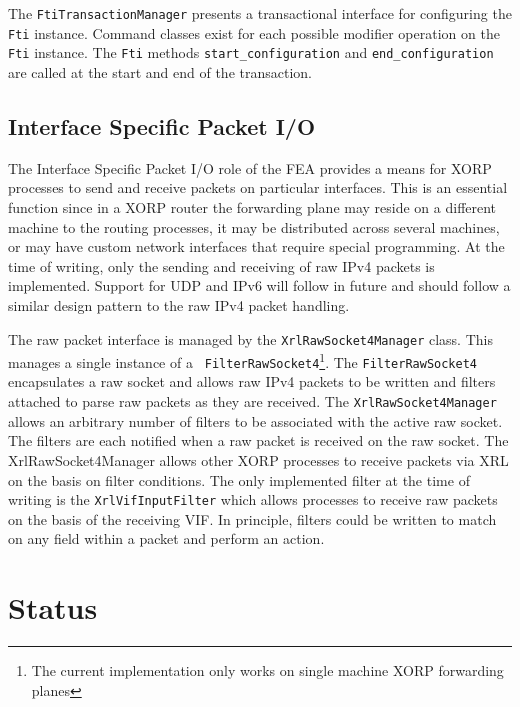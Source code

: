 \documentclass[11pt]{article}
\begin{document}
The {\tt FtiTransactionManager} presents a transactional interface for
configuring the {\tt Fti} instance.  Command classes exist for each
possible modifier operation on the {\tt Fti} instance.  The {\tt Fti}
methods {\tt start\_configuration} and {\tt end\_configuration} are
called at the start and end of the transaction.

\subsection{Interface Specific Packet I/O}

The Interface Specific Packet I/O role of the FEA provides a means for
XORP processes to send and receive packets on particular interfaces.
This is an essential function since in a XORP router the forwarding
plane may reside on a different machine to the routing processes, it
may be distributed across several machines, or may have custom network
interfaces that require special programming.  At the time of writing,
only the sending and receiving of raw IPv4 packets is implemented.
Support for UDP and IPv6 will follow in future and should follow a
similar design pattern to the raw IPv4 packet handling.

The raw packet interface is managed by the {\tt XrlRawSocket4Manager}
class.  This manages a single instance of a {\tt
FilterRawSocket4}\footnote{The current implementation only works on
single machine XORP forwarding planes}.  The {\tt FilterRawSocket4}
encapsulates a raw socket and allows raw IPv4 packets to be written
and filters attached to parse raw packets as they are received.  The
{\tt XrlRawSocket4Manager} allows an arbitrary number of filters to be
associated with the active raw socket.  The filters are each notified
when a raw packet is received on the raw socket.  The
XrlRawSocket4Manager allows other XORP processes to receive packets
via XRL on the basis on filter conditions.  The only implemented
filter at the time of writing is the {\tt XrlVifInputFilter} which
allows processes to receive raw packets on the basis of the receiving
VIF.  In principle, filters could be written to match on any field
within a packet and perform an action.

\section{Status}
\label{sec:status}
\end{document}
